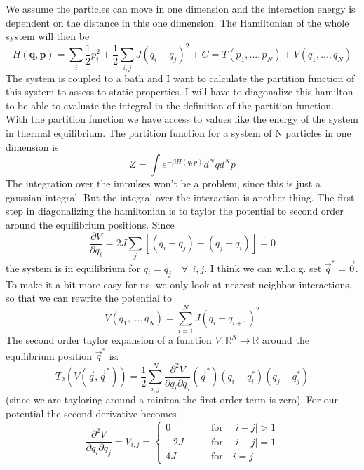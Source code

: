	We assume the particles can move in one dimension and the interaction energy is dependent on the distance in this one dimension. The Hamiltonian of the whole system will then be
	\begin{equation}
		H(\mathbf{q}, \mathbf{p}) = \sum_i \frac{1}{2} p_i^2 + \frac{1}{2} \sum_{i, j} J (q_i - q_j)^2 + C	=	T(p_1, ..., p_N) + V(q_1, ..., q_N)
	\end{equation}
	The system is coupled to a bath and I want to calculate the partition function of this system to assess to static properties. I will have to diagonalize this hamilton to be able to evaluate the integral in the definition of the partition function. With the partition function we have access to values like the energy of the system in thermal equilibrium. The partition function for a system of N particles in one dimension is
	\begin{equation}
		Z =	\int e^{-\beta H(q, p)} d^Nq d^Np
	\end{equation}
	The integration over the impulses won't be a problem, since this is just a gaussian integral. But the integral over the interaction is another thing. The first step in diagonalizing the hamiltonian is to taylor the potential to second order around the equilibrium positions. Since
	\begin{equation}
		\frac{\partial V}{\partial q_i} = 2J \sum_j \left[(q_i - q_j) - (q_j - q_i)\right] \overset{!}{=} 0
	\end{equation}
	the system is in equilibrium for $q_i = q_j \quad \forall ~~ i, j$. I think we can w.l.o.g. set $\vec{q}^* = \vec{0}$. To make it a bit more easy for us, we only look at nearest neighbor interactions, so that we can rewrite the potential to
	\begin{equation}
		V(q_1, ..., q_N) = \sum_{i = 1}^{N} J (q_i - q_{i+1})^2
	\end{equation}
	The second order taylor expansion of a function $V: \mathbb{R}^N \rightarrow \mathbb{R}$ around the equilibrium position $\vec{q}^*$ is:
	\begin{equation}
		T_2(V(\vec{q}, \vec{q}^*)) =	\frac{1}{2} \sum_{i,j}^{N} \frac{\partial^2 V}{\partial q_i \partial q_j} (\vec{q}^*) (q_i - q_i^*) (q_j - q_j^*)
	\end{equation}
	(since we are tayloring around a minima the first order term is zero). For our potential the second derivative becomes
	\begin{equation}
		\frac{\partial^2 V}{\partial q_i \partial q_j} = V_{i, j} =	\begin{cases}
			0 \qquad  &\text{for} \quad |i - j| > 1 \\
			-2J \qquad &\text{for} \quad |i - j| = 1 \\
			4J \qquad &\text{for} \quad i = j
		\end{cases}
	\end{equation}
